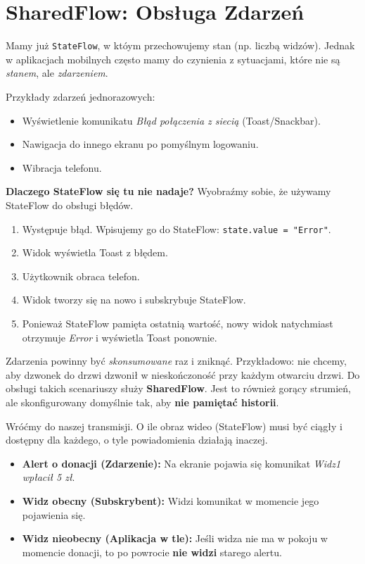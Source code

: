 \section{SharedFlow: Obsługa Zdarzeń}

Mamy już \texttt{StateFlow}, w któym przechowujemy stan (np. liczbą widzów). Jednak w aplikacjach mobilnych często mamy do czynienia z sytuacjami, które nie są \textit{stanem}, ale \textit{zdarzeniem}.

Przykłady zdarzeń jednorazowych:
\begin{itemize}
    \item Wyświetlenie komunikatu \textit{Błąd połączenia z siecią} (Toast/Snackbar).
    \item Nawigacja do innego ekranu po pomyślnym logowaniu.
    \item Wibracja telefonu.
\end{itemize}

\textbf{Dlaczego StateFlow się tu nie nadaje?}
Wyobraźmy sobie, że używamy StateFlow do obsługi błędów.
\begin{enumerate}
    \item Występuje błąd. Wpisujemy go do StateFlow: \texttt{state.value = "Error"}.
    \item Widok wyświetla Toast z błędem.
    \item Użytkownik obraca telefon.
    \item Widok tworzy się na nowo i subskrybuje StateFlow.
    \item Ponieważ StateFlow pamięta ostatnią wartość, nowy widok natychmiast otrzymuje \textit{Error} i wyświetla Toast ponownie.
\end{enumerate}
Zdarzenia powinny być \textit{skonsumowane} raz i zniknąć. Przykładowo: nie chcemy, aby dzwonek do drzwi dzwonił w nieskończoność przy każdym otwarciu drzwi. Do obsługi takich scenariuszy służy \textbf{SharedFlow}. Jest to również gorący strumień, ale skonfigurowany domyślnie tak, aby \textbf{nie pamiętać historii}.

Wróćmy do naszej transmisji. O ile obraz wideo (StateFlow) musi być ciągły i dostępny dla każdego, o tyle powiadomienia działają inaczej.

\begin{itemize}
    \item \textbf{Alert o donacji (Zdarzenie):} Na ekranie pojawia się komunikat \textit{Widz1 wpłacił 5 zł}.
    \item \textbf{Widz obecny (Subskrybent):} Widzi komunikat w momencie jego pojawienia się.
    \item \textbf{Widz nieobecny (Aplikacja w tle):} Jeśli widza nie ma w pokoju w momencie donacji, to po powrocie \textbf{nie widzi} starego alertu.
\end{itemize}

